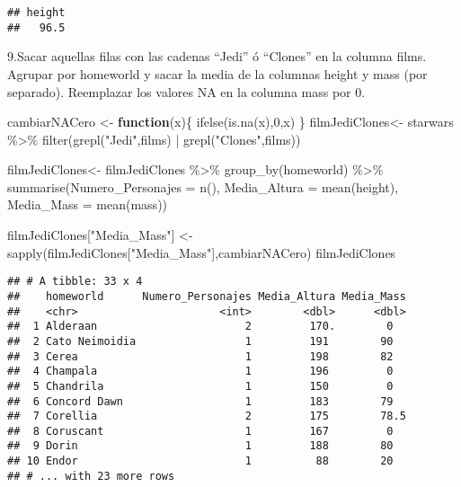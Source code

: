 \documentclass[
]{book}
\newenvironment{Shaded}{\begin{snugshade}}{\end{snugshade}}
\newcommand{\AttributeTok}[1]{\textcolor[rgb]{0.77,0.63,0.00}{#1}}
\newcommand{\ControlFlowTok}[1]{\textcolor[rgb]{0.13,0.29,0.53}{\textbf{#1}}}
\newcommand{\DecValTok}[1]{\textcolor[rgb]{0.00,0.00,0.81}{#1}}
\newcommand{\FunctionTok}[1]{\textcolor[rgb]{0.00,0.00,0.00}{#1}}
\newcommand{\NormalTok}[1]{#1}
\newcommand{\OtherTok}[1]{\textcolor[rgb]{0.56,0.35,0.01}{#1}}
\newcommand{\SpecialCharTok}[1]{\textcolor[rgb]{0.00,0.00,0.00}{#1}}
\newcommand{\StringTok}[1]{\textcolor[rgb]{0.31,0.60,0.02}{#1}}
\begin{document}
\begin{verbatim}
## height 
##   96.5
\end{verbatim}

9.Sacar aquellas filas con las cadenas ``Jedi'' ó ``Clones'' en la columna films. Agrupar por homeworld y sacar la media de la columnas height y mass (por separado). Reemplazar los valores NA en la columna mass por 0.

\begin{Shaded}
\begin{Highlighting}[]
\NormalTok{cambiarNACero }\OtherTok{\textless{}{-}} \ControlFlowTok{function}\NormalTok{(x)\{}
  \FunctionTok{ifelse}\NormalTok{(}\FunctionTok{is.na}\NormalTok{(x),}\DecValTok{0}\NormalTok{,x)}
\NormalTok{\}}
\NormalTok{filmJediClones}\OtherTok{\textless{}{-}}\NormalTok{ starwars }\SpecialCharTok{\%\textgreater{}\%} \FunctionTok{filter}\NormalTok{(}\FunctionTok{grepl}\NormalTok{(}\StringTok{"Jedi"}\NormalTok{,films) }\SpecialCharTok{|} \FunctionTok{grepl}\NormalTok{(}\StringTok{"Clones"}\NormalTok{,films)) }

\NormalTok{filmJediClones}\OtherTok{\textless{}{-}}\NormalTok{ filmJediClones }\SpecialCharTok{\%\textgreater{}\%} \FunctionTok{group\_by}\NormalTok{(homeworld) }\SpecialCharTok{\%\textgreater{}\%} \FunctionTok{summarise}\NormalTok{(}\AttributeTok{Numero\_Personajes =} \FunctionTok{n}\NormalTok{(), }\AttributeTok{Media\_Altura =} \FunctionTok{mean}\NormalTok{(height), }\AttributeTok{Media\_Mass =} \FunctionTok{mean}\NormalTok{(mass))}


\NormalTok{filmJediClones[}\StringTok{"Media\_Mass"}\NormalTok{] }\OtherTok{\textless{}{-}}  \FunctionTok{sapply}\NormalTok{(filmJediClones[}\StringTok{"Media\_Mass"}\NormalTok{],cambiarNACero)}
\NormalTok{filmJediClones}
\end{Highlighting}
\end{Shaded}

\begin{verbatim}
## # A tibble: 33 x 4
##    homeworld      Numero_Personajes Media_Altura Media_Mass
##    <chr>                      <int>        <dbl>      <dbl>
##  1 Alderaan                       2         170.        0  
##  2 Cato Neimoidia                 1         191        90  
##  3 Cerea                          1         198        82  
##  4 Champala                       1         196         0  
##  5 Chandrila                      1         150         0  
##  6 Concord Dawn                   1         183        79  
##  7 Corellia                       2         175        78.5
##  8 Coruscant                      1         167         0  
##  9 Dorin                          1         188        80  
## 10 Endor                          1          88        20  
## # ... with 23 more rows
\end{verbatim}
\end{document}
